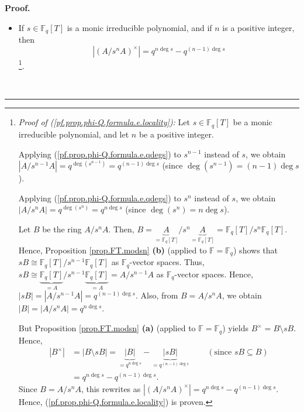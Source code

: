 \documentclass[numbers=enddot,12pt,final,onecolumn,notitlepage]{scrartcl}%
\theoremstyle{definition}
\newenvironment{proof}[1][Proof]{\noindent\textbf{#1.} }{\ \rule{0.5em}{0.5em}}
\begin{document}
\begin{proof}
\begin{itemize}
\item If $s\in\mathbb{F}_{q}\left[  T\right]  $ is a monic irreducible
polynomial, and if $n$ is a positive integer, then%
\begin{equation}
\left\vert \left(  A/s^{n}A\right)  ^{\times}\right\vert =q^{n\deg
s}-q^{\left(  n-1\right)  \deg s} \label{pf.prop.phi-Q.formula.e.locality}%
\end{equation}
\footnote{\textit{Proof of (\ref{pf.prop.phi-Q.formula.e.locality}):} Let
$s\in\mathbb{F}_{q}\left[  T\right]  $ be a monic irreducible polynomial, and
let $n$ be a positive integer.
\par
Applying (\ref{pf.prop.phi-Q.formula.e.qdegs}) to $s^{n-1}$ instead of $s$, we
obtain $\left\vert A/s^{n-1}A\right\vert =q^{\deg\left(  s^{n-1}\right)
}=q^{\left(  n-1\right)  \deg s}$ (since $\deg\left(  s^{n-1}\right)  =\left(
n-1\right)  \deg s$).
\par
Applying (\ref{pf.prop.phi-Q.formula.e.qdegs}) to $s^{n}$ instead of $s$, we
obtain $\left\vert A/s^{n}A\right\vert =q^{\deg\left(  s^{n}\right)
}=q^{n\deg s}$ (since $\deg\left(  s^{n}\right)  =n\deg s$).
\par
Let $B$ be the ring $A/s^{n}A$. Then, $B=\underbrace{A}_{=\mathbb{F}%
_{q}\left[  T\right]  }/s^{n}\underbrace{A}_{=\mathbb{F}_{q}\left[  T\right]
}=\mathbb{F}_{q}\left[  T\right]  /s^{n}\mathbb{F}_{q}\left[  T\right]  $.
Hence, Proposition \ref{prop.FT.modsn} \textbf{(b)} (applied to $\mathbb{F}%
=\mathbb{F}_{q}$) shows that $sB\cong\mathbb{F}_{q}\left[  T\right]
/s^{n-1}\mathbb{F}_{q}\left[  T\right]  $ as $\mathbb{F}_{q}$-vector spaces.
Thus, $sB\cong\underbrace{\mathbb{F}_{q}\left[  T\right]  }_{=A}%
/s^{n-1}\underbrace{\mathbb{F}_{q}\left[  T\right]  }_{=A}=A/s^{n-1}A$ as
$\mathbb{F}_{q}$-vector spaces. Hence, $\left\vert sB\right\vert =\left\vert
A/s^{n-1}A\right\vert =q^{\left(  n-1\right)  \deg s}$. Also, from
$B=A/s^{n}A$, we obtain $\left\vert B\right\vert =\left\vert A/s^{n}%
A\right\vert =q^{n\deg s}$.
\par
But Proposition \ref{prop.FT.modsn} \textbf{(a)} (applied to $\mathbb{F}%
=\mathbb{F}_{q}$) yields $B^{\times}=B\setminus sB$. Hence,%
\begin{align*}
\left\vert B^{\times}\right\vert  &  =\left\vert B\setminus sB\right\vert
=\underbrace{\left\vert B\right\vert }_{=q^{n\deg s}}-\underbrace{\left\vert
sB\right\vert }_{=q^{\left(  n-1\right)  \deg s}}\ \ \ \ \ \ \ \ \ \ \left(
\text{since }sB\subseteq B\right) \\
&  =q^{n\deg s}-q^{\left(  n-1\right)  \deg s}.
\end{align*}
Since $B=A/s^{n}A$, this rewrites as $\left\vert \left(  A/s^{n}A\right)
^{\times}\right\vert =q^{n\deg s}-q^{\left(  n-1\right)  \deg s}$. Hence,
(\ref{pf.prop.phi-Q.formula.e.locality}) is proven.}.
\end{itemize}


\end{proof}
\end{document}

